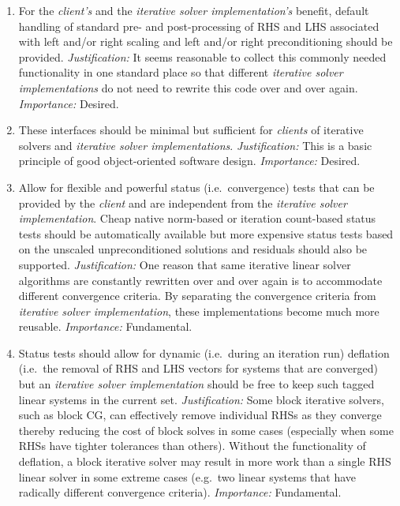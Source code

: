 \documentclass[pdf,ps2pdf,11pt]{SANDreport}
\begin{document}
\begin{enumerate}
\item
For the {}\textit{client's} and the {}\textit{iterative solver
implementation's} benefit, default handling of standard pre- and
post-processing of RHS and LHS associated with left and/or right
scaling and left and/or right preconditioning should be provided.
{}\textit{Justification:} It seems reasonable to collect this commonly
needed functionality in one standard place so that different
{}\textit{iterative solver implementations} do not need to rewrite
this code over and over again.  {}\textit{Importance:} Desired.

\item
These interfaces should be minimal but sufficient for
{}\textit{clients} of iterative solvers and {}\textit{iterative solver
implementations}.  {}\textit{Justification:} This is a basic principle
of good object-oriented software design.  {}\textit{Importance:}
Desired.

\item
Allow for flexible and powerful status (i.e.~convergence) tests that
can be provided by the {}\textit{client} and are independent from the
{}\textit{iterative solver implementation}.  Cheap native norm-based
or iteration count-based status tests should be automatically
available but more expensive status tests based on the unscaled
unpreconditioned solutions and residuals should also be supported.
{}\textit{Justification:} One reason that same iterative linear solver
algorithms are constantly rewritten over and over again is to
accommodate different convergence criteria.  By separating the
convergence criteria from {}\textit{iterative solver implementation},
these implementations become much more reusable.
{}\textit{Importance:} Fundamental.

\item
Status tests should allow for dynamic (i.e.~during an iteration run)
deflation (i.e.~the removal of RHS and LHS vectors for systems that
are converged) but an {}\textit{iterative solver implementation}
should be free to keep such tagged linear systems in the current set.
{}\textit{Justification:} Some block iterative solvers, such as block
CG, can effectively remove individual RHSs as they converge thereby
reducing the cost of block solves in some cases (especially when some
RHSs have tighter tolerances than others).  Without the functionality
of deflation, a block iterative solver may result in more work than a
single RHS linear solver in some extreme cases (e.g.~two linear
systems that have radically different convergence criteria).
{}\textit{Importance:} Fundamental.


\end{enumerate}
\end{document}
